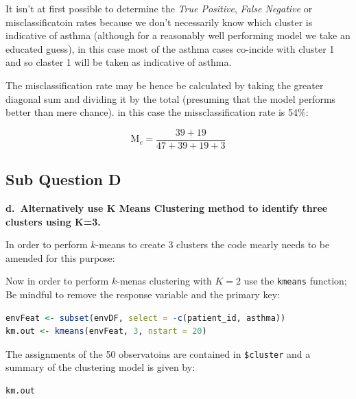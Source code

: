 \documentclass[
]{article}
\newcommand{\passthrough}[1]{#1}
\begin{document}
It isn't at first possible to determine the \emph{True Positive},
\emph{False Negative} or misclassificatoin rates because we don't
necessarily know which cluster is indicative of asthma (although for a
reasonably well performing model we take an educated guess), in this
case most of the asthma cases co-incide with cluster 1 and so claster 1
will be taken as indicative of asthma.

The misclassification rate may be hence be calculated by taking the
greater diagonal sum and dividing it by the total (presuming that the
model performs better than mere chance). in this case the
missclassification rate is 54\%:

\[
\text{M}_c = \frac{39+ 19}{47+ 39+ 19+ 3}
\]

\hypertarget{sub-question-d}{%
\subsection{Sub Question D}\label{sub-question-d}}

\textbf{d.~Alternatively use K Means Clustering method to identify three
clusters using K=3.}

In order to perform \(k\)-means to create 3 clusters the code mearly
needs to be amended for this purpose:

Now in order to perform \(k\)-menas clustering with \(K=2\) use the
\passthrough{\lstinline!kmeans!} function; Be mindful to remove the
response variable and the primary key:

\begin{lstlisting}[language=R]
envFeat <- subset(envDF, select = -c(patient_id, asthma))
km.out <- kmeans(envFeat, 3, nstart = 20)
\end{lstlisting}

The assignments of the 50 observatoins are contained in
\passthrough{\lstinline!$cluster!} and a summary of the clustering model
is given by:

\begin{lstlisting}[language=R]
km.out
\end{lstlisting}
\end{document}
